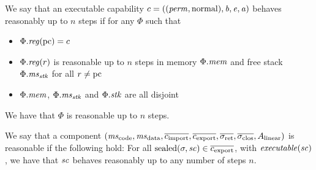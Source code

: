 \documentclass[a4paper]{article}
\begin{document}
  \begin{definition}[Reasonable pc]
    \label{def:reasonable-pc}
    We say that an executable capability $c =
    ((\mathit{perm},\mathrm{normal}),\mathit{b},\mathit{e},\mathit{a})$ behaves reasonably up to $n$ steps
    if for any $\Phi$ such that
    \begin{itemize}
    \item $\Phi.\reg(\pcreg) = c$
    \item $\Phi.\reg(r)$ is reasonable up to $n$ steps in memory $\Phi.\mathit{mem}$ and
      free stack $\Phi.\mathit{ms}_{\mathit{stk}}$ for all $r \neq \mathrm{pc}$
    \item $\Phi.\mathit{mem}$, $\Phi.\mathit{ms}_{\mathit{stk}}$ and $\Phi.\mathit{stk}$ are all disjoint
    \end{itemize}
    We have that $\Phi$ is reasonable up to $n$ steps.
  \end{definition}

  \begin{definition}
    \label{def:reasonable-component}
    We say that a component
    $(\mscode,\msdata,\overline{c_{\mathrm{import}}},\overline{c_{\mathrm{export}}},\sigrets,\sigcloss,A_\linear)$
    is reasonable if the following hold: For all $\mathrm{sealed}(\sigma,\mathit{sc}) \in
    \overline{c_{\mathrm{export}}}$, with $\exec{\vsc}$, we have that $\mathit{sc}$
    behaves reasonably up to any number of steps $n$.
  \end{definition}


\end{document}
